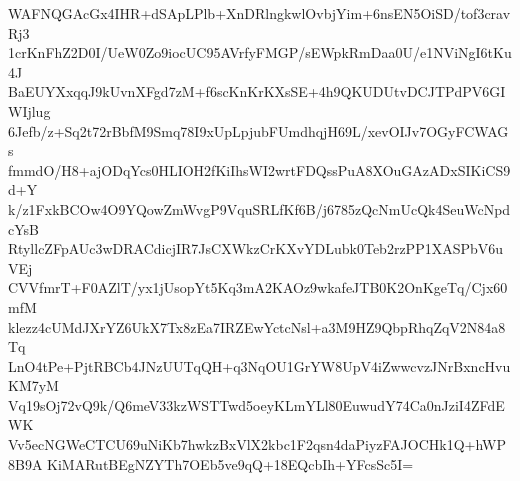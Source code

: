 WAFNQGAcGx4IHR+dSApLPlb+XnDRlngkwlOvbjYim+6nsEN5OiSD/tof3cravRj3
1crKnFhZ2D0I/UeW0Zo9iocUC95AVrfyFMGP/sEWpkRmDaa0U/e1NViNgI6tKu4J
BaEUYXxqqJ9kUvnXFgd7zM+f6scKnKrKXsSE+4h9QKUDUtvDCJTPdPV6GIWIjlug
6Jefb/z+Sq2t72rBbfM9Smq78I9xUpLpjubFUmdhqjH69L/xevOIJv7OGyFCWAGs
fmmdO/H8+ajODqYcs0HLIOH2fKiIhsWI2wrtFDQssPuA8XOuGAzADxSIKiCS9d+Y
k/z1FxkBCOw4O9YQowZmWvgP9VquSRLfKf6B/j6785zQcNmUcQk4SeuWcNpdcYsB
RtyllcZFpAUc3wDRACdicjIR7JsCXWkzCrKXvYDLubk0Teb2rzPP1XASPbV6uVEj
CVVfmrT+F0AZlT/yx1jUsopYt5Kq3mA2KAOz9wkafeJTB0K2OnKgeTq/Cjx60mfM
klezz4cUMdJXrYZ6UkX7Tx8zEa7IRZEwYctcNsl+a3M9HZ9QbpRhqZqV2N84a8Tq
LnO4tPe+PjtRBCb4JNzUUTqQH+q3NqOU1GrYW8UpV4iZwwcvzJNrBxncHvuKM7yM
Vq19sOj72vQ9k/Q6meV33kzWSTTwd5oeyKLmYLl80EuwudY74Ca0nJziI4ZFdEWK
Vv5ecNGWeCTCU69uNiKb7hwkzBxVlX2kbc1F2qsn4daPiyzFAJOCHk1Q+hWP8B9A
KiMARutBEgNZYTh7OEb5ve9qQ+18EQcbIh+YFcsSc5I=
